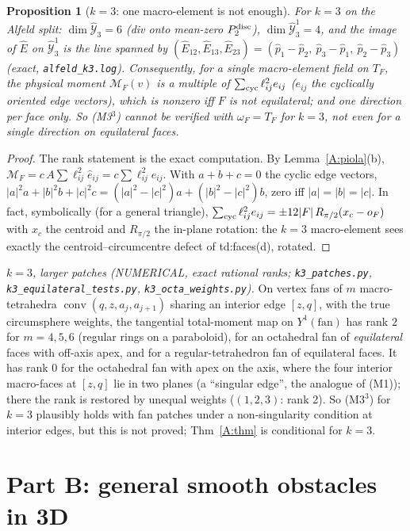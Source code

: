 \documentclass[11pt]{article}
\newtheorem{proposition}[theorem]{Proposition}
\theoremstyle{definition}
\newcommand{\M}{\mathcal M}
\begin{document}
\begin{proposition}[$k=3$: one macro-element is not enough]\label{A:k3}
For $k=3$ on the Alfeld split: $\dim\hat{\mathcal Y}_3=6$ (div onto mean-zero $P_2^{\rm disc}$), $\dim\hat{\mathcal Y}^1_3=4$, and the image of $\hat E$ on $\hat{\mathcal Y}^1_3$ is the line spanned by $(\hat E_{12},\hat E_{13},\hat E_{23})=(\hat p_1-\hat p_2,\ \hat p_3-\hat p_1,\ \hat p_2-\hat p_3)$ (exact, \texttt{alfeld\_k3.log}). Consequently, for a single macro-element field on $T_F$, the physical moment $\M_F(v)$ is a multiple of $\sum_{\rm cyc}\ell_{ij}^2e_{ij}$ ($e_{ij}$ the cyclically oriented edge vectors), which is nonzero iff $F$ is not equilateral; and one direction per face only. So (M3$^3$) cannot be verified with $\omega_F=T_F$ for $k=3$, not even for a single direction on equilateral faces.
\end{proposition}
\begin{proof}
The rank statement is the exact computation. By Lemma~\ref{A:piola}(b), $\M_F=c\,A\sum\ell_{ij}^2\hat e_{ij}=c\sum\ell_{ij}^2e_{ij}$. With $a+b+c=0$ the cyclic edge vectors, $|a|^2a+|b|^2b+|c|^2c=(|a|^2-|c|^2)a+(|b|^2-|c|^2)b$, zero iff $|a|=|b|=|c|$. In fact, symbolically (for a general triangle), $\sum_{\rm cyc}\ell_{ij}^2e_{ij}=\pm12|F|\,R_{\pi/2}(x_c-o_F)$ with $x_c$ the centroid and $R_{\pi/2}$ the in-plane rotation: the $k=3$ macro-element sees exactly the centroid--circumcentre defect of td:faces(d), rotated.
\end{proof}
\emph{$k=3$, larger patches (NUMERICAL, exact rational ranks; \texttt{k3\_patches.py}, \texttt{k3\_equilateral\_tests.py}, \texttt{k3\_octa\_weights.py}).} On vertex fans of $m$ macro-tetrahedra $\operatorname{conv}(q,z,a_j,a_{j+1})$ sharing an interior edge $[z,q]$, with the true circumsphere weights, the tangential total-moment map on $Y^1(\text{fan})$ has rank $2$ for $m=4,5,6$ (regular rings on a paraboloid), for an octahedral fan of \emph{equilateral} faces with off-axis apex, and for a regular-tetrahedron fan of equilateral faces. It has rank $0$ for the octahedral fan with apex on the axis, where the four interior macro-faces at $[z,q]$ lie in two planes (a ``singular edge'', the analogue of (M1)); there the rank is restored by unequal weights ($(1,2,3)$: rank 2). So (M3$^3$) for $k=3$ plausibly holds with fan patches under a non-singularity condition at interior edges, but this is not proved; Thm~\ref{A:thm} is conditional for $k=3$.

\section{Part B: general smooth obstacles in 3D}\label{B:sec}
\end{document}

